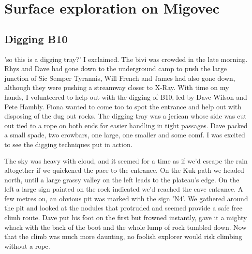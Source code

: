 \begin{marginfigure}
\end{marginfigure}
\section{Surface exploration on Migovec}
\subsection{Digging B10}
'so this is a digging tray?' I exclaimed. The bivi was crowded in the late morning. Rhys and Dave had gone down to the underground camp to push the large junction of Sic Semper Tyrannis, Will French and James had also gone down, although they were pushing a streamway closer to X-Ray. With time on my hands, I volunteered to help out with the digging of B10, led by Dave Wilson and Pete Hambly. Fiona wanted to come too to spot the entrance and help out with disposing of the dug out rocks. The digging tray was a jerican whose side was cut out tied to a rope on both ends for easier handling in tight passages. Dave packed a small spade, two crowbars, one large, one smaller and some comf. I was excited to see the digging techniques put in action.

The sky was heavy with cloud, and it seemed for a time as if we'd escape the rain altogether if we quickened the pace to the entrance. On the Kuk path we headed north, until a large grassy valley on the left leads to the plateau's edge. On the left a large sign painted on the rock indicated we'd reached the cave entrance. A few metres on, an obvious pit was marked with the sign 'N4'.  We gathered around the pit and looked at the nodules that protruded and seemed provide a safe free climb route. Dave put his foot on the first but frowned instantly, gave it a mighty whack with the back of the boot and the whole lump of rock tumbled down. Now that the climb was much more daunting, no foolish explorer would risk climbing without a rope.

